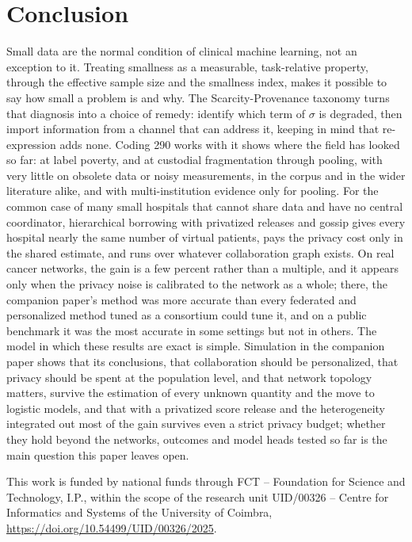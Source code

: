 \documentclass[acmsmall,screen,review]{acmart}
\theoremstyle{acmdefinition}
\begin{document}
\section{Conclusion}\label{sec:conclusion}

Small data are the normal condition of clinical machine learning, not an exception to it. Treating smallness as a measurable, task-relative property, through the effective sample size and the smallness index, makes it possible to say how small a problem is and why. The Scarcity-Provenance taxonomy turns that diagnosis into a choice of remedy: identify which term of $\sigma$ is degraded, then import information from a channel that can address it, keeping in mind that re-expression adds none. Coding 290 works with it shows where the field has looked so far: at label poverty, and at custodial fragmentation through pooling, with very little on obsolete data or noisy measurements, in the corpus and in the wider literature alike, and with multi-institution evidence only for pooling. For the common case of many small hospitals that cannot share data and have no central coordinator, hierarchical borrowing with privatized releases and gossip gives every hospital nearly the same number of virtual patients, pays the privacy cost only in the shared estimate, and runs over whatever collaboration graph exists. On real cancer networks, the gain is a few percent rather than a multiple, and it appears only when the privacy noise is calibrated to the network as a whole; there, the companion paper's method was more accurate than every federated and personalized method tuned as a consortium could tune it, and on a public benchmark it was the most accurate in some settings but not in others. The model in which these results are exact is simple. Simulation in the companion paper shows that its conclusions, that collaboration should be personalized, that privacy should be spent at the population level, and that network topology matters, survive the estimation of every unknown quantity and the move to logistic models, and that with a privatized score release and the heterogeneity integrated out most of the gain survives even a strict privacy budget; whether they hold beyond the networks, outcomes and model heads tested so far is the main question this paper leaves open.

\begin{acks}
This work is funded by national funds through FCT -- Foundation for Science and Technology, I.P., within the scope of the research unit UID/00326 -- Centre for Informatics and Systems of the University of Coimbra, \url{https://doi.org/10.54499/UID/00326/2025}.
\end{acks}




\nocite{brasil2019artificial,brown2020language,kairouz2021advances}

\end{document}
